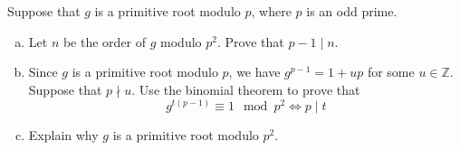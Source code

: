 \documentclass[11pt,letterpaper]{report}
\newcommand{\integers}{\mathbb{Z}}
\begin{document}
\begin{enumerate}
	\vfill Suppose that $g$ is a primitive root modulo $p$, where $p$ is an odd prime.
	\begin{enumerate}[(a)]
		\item Let $n$ be the order of $g$ modulo $p^2$. Prove that $p-1\mid n$.
		\vfill
		\item Since $g$ is a primitive root modulo $p$, we have $g^{p-1}=1+up$ for some $u\in \integers$. Suppose that $p\nmid u$. Use the binomial theorem to prove that
		\[
		g^{t(p-1)}\equiv 1\mod{p^2}\iff p\mid t
		\]

		\vfill

		\item Explain why $g$ is a primitive root modulo $p^2$.
		\vfill
	\end{enumerate}
\end{enumerate}
\end{document}
